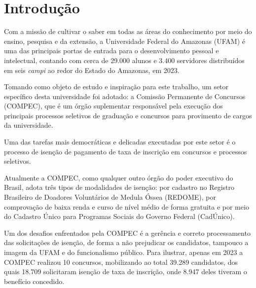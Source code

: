 \documentclass[
	12pt,			%
	openright,		%
	oneside,	
	a4paper,		%
	english,		%
	brazil			%
]{abntex2/abntex2}  %
\begin{document}



	\tableofcontents*
	\cleardoublepage

	\textual

	\chapter{Introdução}
	
		Com a missão de cultivar o saber em todas as áreas do conhecimento por meio do ensino, pesquisa e da extensão, a Universidade Federal do Amazonas (UFAM) é uma das principais portas de entrada para o desenvolvimento pessoal e intelectual, contando com cerca de 29.000 alunos e 3.400 servidores distribuídos em seis \textit{campi} ao redor do Estado do Amazonas, em 2023.
		
		Tomando como objeto de estudo e inspiração para este trabalho, um setor específico desta universidade foi adotado: a Comissão Permanente de Concursos (COMPEC), que é um órgão suplementar responsável pela execução dos principais processos seletivos de graduação e concursos para provimento de cargos da universidade.
		
		Uma das tarefas mais democráticas e delicadas executadas por este setor é o processo de isenção de pagamento de taxa de inscrição em concursos e processos seletivos.
		
		Atualmente a COMPEC, como qualquer outro órgão do poder executivo do Brasil, adota três tipos de modalidades de isenção: por cadastro no Registro Brasileiro de Doadores Voluntários de Medula Óssea (REDOME), por comprovação de baixa renda e curso de nível médio de forma gratuita e por meio do Cadastro Único para Programas Sociais do Governo Federal (CadÚnico).
		
		Um dos desafios enfrentados pela COMPEC é a gerência e correto processamento das solicitações de isenção, de forma a não prejudicar os candidatos, tampouco a imagem da UFAM e do funcionalismo público. Para ilustrar, apenas em 2023 a COMPEC realizou 10 concursos, mobilizando ao total 39.289 candidatos, dos quais 18.709 solicitaram isenção de taxa de inscrição, onde 8.947 deles tiveram o benefício concedido.
		
\end{document}
